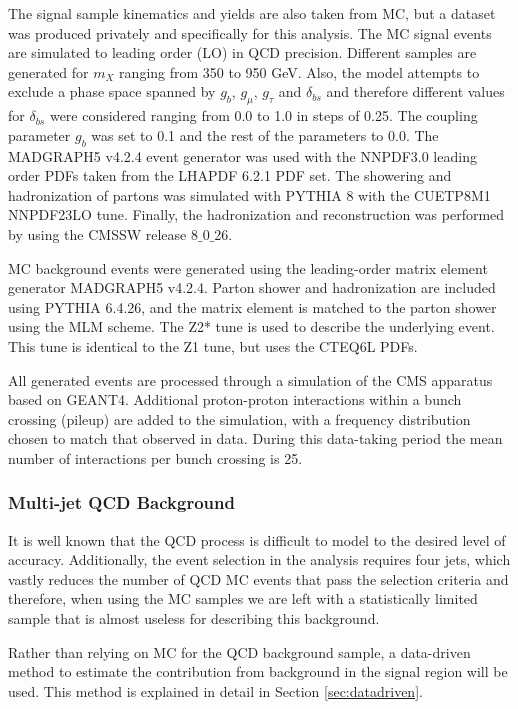 The signal sample kinematics and yields are also taken from MC, but a dataset was produced privately and specifically for this analysis. The MC signal events are simulated to leading order (LO) in QCD precision. Different samples are generated for $m_{X}$ ranging from 350 to 950 GeV. Also, the model attempts to exclude a phase space spanned by $g_{b}$, $g_{\mu}$, $g_{\tau}$ and $\delta_{bs}$ and therefore different values for $\delta_{bs}$ were considered ranging from 0.0 to 1.0 in steps of 0.25. The coupling parameter $g_{b}$ was set to 0.1 and the rest of the parameters to 0.0.  The MADGRAPH5 v4.2.4 event generator was used with the NNPDF3.0 leading order PDFs taken from the LHAPDF 6.2.1 PDF set. The showering and hadronization of partons was simulated with PYTHIA 8 with the CUETP8M1 NNPDF23LO tune. Finally, the hadronization and reconstruction was performed by using the CMSSW release 8$\_$0$\_$26.

MC background events were generated using the leading-order matrix element generator MADGRAPH5 v4.2.4. Parton shower and hadronization are included using PYTHIA 6.4.26, and the matrix element is matched to the parton shower using the MLM scheme. The Z2* tune is used to describe the underlying event. This tune is identical to the Z1 tune, but uses the CTEQ6L PDFs.

All generated events are processed through a simulation of the CMS apparatus based on GEANT4. Additional proton-proton interactions within a bunch crossing (pileup) are added to the simulation, with a frequency distribution chosen to match that observed in data. During this data-taking period the mean number of interactions per bunch crossing is 25.

\subsubsection{Multi-jet QCD Background}
It is well known that the QCD process is difficult to model to the desired level of accuracy. Additionally, the event selection in the analysis requires four jets, which vastly reduces the number of QCD MC events that pass the selection criteria and therefore, when using the MC samples we are left with a statistically limited sample that is almost useless for describing this background.

Rather than relying on MC for the QCD background sample, a data-driven method to estimate the contribution from background in the signal region will be used. This method is explained in detail in Section \ref{sec:datadriven}.

